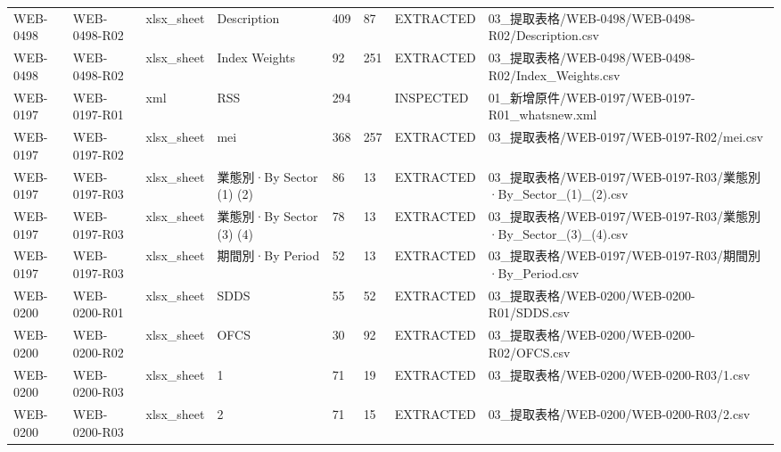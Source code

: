 \begin{landscape}
\begin{longtable}{p{1.8cm}p{2.2cm}p{3.1cm}p{4.7cm}p{1.3cm}p{1.3cm}p{3.0cm}p{5.3cm}}
WEB-0498 & WEB-0498-R02 & xlsx\_\allowbreak{}sheet & Description & 409 & 87 & EXTRACTED & 03\_\allowbreak{}提取表格/\allowbreak{}WEB-0498/\allowbreak{}WEB-0498-R02/\allowbreak{}Description.csv\\
WEB-0498 & WEB-0498-R02 & xlsx\_\allowbreak{}sheet & Index Weights & 92 & 251 & EXTRACTED & 03\_\allowbreak{}提取表格/\allowbreak{}WEB-0498/\allowbreak{}WEB-0498-R02/\allowbreak{}Index\_\allowbreak{}Weights.csv\\
WEB-0197 & WEB-0197-R01 & xml & RSS & 294 &  & INSPECTED & 01\_\allowbreak{}新增原件/\allowbreak{}WEB-0197/\allowbreak{}WEB-0197-R01\_\allowbreak{}whatsnew.xml\\
WEB-0197 & WEB-0197-R02 & xlsx\_\allowbreak{}sheet & mei & 368 & 257 & EXTRACTED & 03\_\allowbreak{}提取表格/\allowbreak{}WEB-0197/\allowbreak{}WEB-0197-R02/\allowbreak{}mei.csv\\
WEB-0197 & WEB-0197-R03 & xlsx\_\allowbreak{}sheet & 業態別·By Sector (1) (2) & 86 & 13 & EXTRACTED & 03\_\allowbreak{}提取表格/\allowbreak{}WEB-0197/\allowbreak{}WEB-0197-R03/\allowbreak{}業態別·By\_\allowbreak{}Sector\_\allowbreak{}(1)\_\allowbreak{}(2).csv\\
WEB-0197 & WEB-0197-R03 & xlsx\_\allowbreak{}sheet & 業態別·By Sector (3) (4) & 78 & 13 & EXTRACTED & 03\_\allowbreak{}提取表格/\allowbreak{}WEB-0197/\allowbreak{}WEB-0197-R03/\allowbreak{}業態別·By\_\allowbreak{}Sector\_\allowbreak{}(3)\_\allowbreak{}(4).csv\\
WEB-0197 & WEB-0197-R03 & xlsx\_\allowbreak{}sheet & 期間別·By Period & 52 & 13 & EXTRACTED & 03\_\allowbreak{}提取表格/\allowbreak{}WEB-0197/\allowbreak{}WEB-0197-R03/\allowbreak{}期間別·By\_\allowbreak{}Period.csv\\
WEB-0200 & WEB-0200-R01 & xlsx\_\allowbreak{}sheet & SDDS & 55 & 52 & EXTRACTED & 03\_\allowbreak{}提取表格/\allowbreak{}WEB-0200/\allowbreak{}WEB-0200-R01/\allowbreak{}SDDS.csv\\
WEB-0200 & WEB-0200-R02 & xlsx\_\allowbreak{}sheet & OFCS & 30 & 92 & EXTRACTED & 03\_\allowbreak{}提取表格/\allowbreak{}WEB-0200/\allowbreak{}WEB-0200-R02/\allowbreak{}OFCS.csv\\
WEB-0200 & WEB-0200-R03 & xlsx\_\allowbreak{}sheet & 1 & 71 & 19 & EXTRACTED & 03\_\allowbreak{}提取表格/\allowbreak{}WEB-0200/\allowbreak{}WEB-0200-R03/\allowbreak{}1.csv\\
WEB-0200 & WEB-0200-R03 & xlsx\_\allowbreak{}sheet & 2 & 71 & 15 & EXTRACTED & 03\_\allowbreak{}提取表格/\allowbreak{}WEB-0200/\allowbreak{}WEB-0200-R03/\allowbreak{}2.csv\\

\end{longtable}
\end{landscape}
